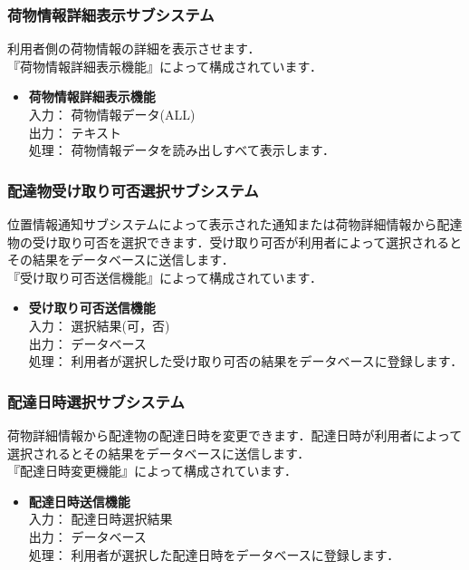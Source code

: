 \documentclass[a4j,titlepage]{jarticle}
\begin{document}
\subsubsection{荷物情報詳細表示サブシステム}
利用者側の荷物情報の詳細を表示させます．\\
『荷物情報詳細表示機能』によって構成されています．
\begin{itemize}
\item \textbf{荷物情報詳細表示機能} \\
入力： 荷物情報データ(ALL) \\
出力： テキスト \\
処理： 荷物情報データを読み出しすべて表示します．
\end{itemize}

\subsubsection{配達物受け取り可否選択サブシステム}
位置情報通知サブシステムによって表示された通知または荷物詳細情報から配達物の受け取り可否を選択できます．受け取り可否が利用者によって選択されるとその結果をデータベースに送信します．\\
『受け取り可否送信機能』によって構成されています．
\begin{itemize}
\item \textbf{受け取り可否送信機能} \\
入力： 選択結果(可，否) \\
出力： データベース \\
処理： 利用者が選択した受け取り可否の結果をデータベースに登録します．
\end{itemize}

\subsubsection{配達日時選択サブシステム}
荷物詳細情報から配達物の配達日時を変更できます．配達日時が利用者によって選択されるとその結果をデータベースに送信します．\\
『配達日時変更機能』によって構成されています．
\begin{itemize}
\item \textbf{配達日時送信機能} \\
入力： 配達日時選択結果\\
出力： データベース \\
処理： 利用者が選択した配達日時をデータベースに登録します．
\end{itemize}
\end{document}

